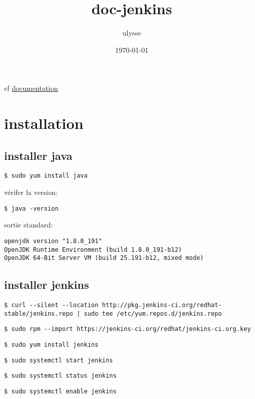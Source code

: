 \documentclass[11pt]{article}
\author{ulysse}
\date{\today}
\title{doc-jenkins}
\begin{document}
\maketitle
\tableofcontents

cf \href{https://linuxize.com/post/how-to-install-jenkins-on-centos-7/}{documentation}
\section{installation}
\label{sec-1}
\subsection{installer java}
\label{sec-1-1}
\begin{verbatim}
$ sudo yum install java
\end{verbatim}
vérifer la version:
\begin{verbatim}
$ java -version
\end{verbatim}
sortie standard:
\begin{verbatim}
openjdk version "1.8.0_191"
OpenJDK Runtime Environment (build 1.8.0_191-b12)
OpenJDK 64-Bit Server VM (build 25.191-b12, mixed mode)
\end{verbatim}
\subsection{installer jenkins}
\label{sec-1-2}
\begin{verbatim}
$ curl --silent --location http://pkg.jenkins-ci.org/redhat-stable/jenkins.repo | sudo tee /etc/yum.repos.d/jenkins.repo
\end{verbatim}

\begin{verbatim}
$ sudo rpm --import https://jenkins-ci.org/redhat/jenkins-ci.org.key
\end{verbatim}

\begin{verbatim}
$ sudo yum install jenkins
\end{verbatim}

\begin{verbatim}
$ sudo systemctl start jenkins
\end{verbatim}

\begin{verbatim}
$ sudo systemctl status jenkins
\end{verbatim}

\begin{verbatim}
$ sudo systemctl enable jenkins
\end{verbatim}
\end{document}
